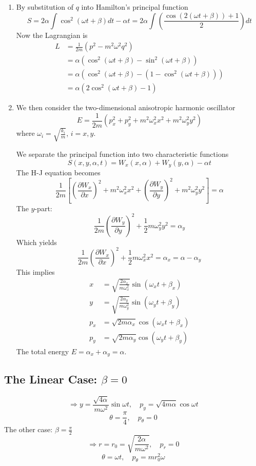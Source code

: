 \documentclass{article}
\begin{document}
\begin{enumerate}
		\item By substitution of $q$ into Hamilton's principal function
		\[ S = 2\alpha \int \cos^2(\omega t + \beta) dt - \alpha t = 2\alpha \int \left(\frac{\cos(2(\omega t + \beta)) + 1}{2}\right) dt \]
		Now the Lagrangian is
		\begin{align*}
			L &= \frac{1}{2m}(p^2 - m^2 \omega^2 q^2) \\
			&= \alpha(\cos^2(\omega t + \beta) - \sin^2(\omega t + \beta)) \\
			&= \alpha\left(\cos^2(\omega t + \beta) - (1 - \cos^2(\omega t + \beta))\right) \\
			&= \alpha(2\cos^2(\omega t + \beta) - 1)
		\end{align*}
		
		\item We then consider the two-dimensional anisotropic harmonic oscillator
		\[ E = \frac{1}{2m}(p_x^2 + p_y^2 + m^2 \omega_x^2 x^2 + m^2 \omega_y^2 y^2) \]
		where $\omega_i = \sqrt{\frac{k_i}{m}}$, $i=x,y$.
		
		We separate the principal function into two characteristic functions
		\[ S(x, y, \alpha, t) = W_x(x, \alpha) + W_y(y, \alpha) - \alpha t \]
		The H-J equation becomes
		\[ \frac{1}{2m}\left[ \left(\frac{\partial W_x}{\partial x}\right)^2 + m^2 \omega_x^2 x^2 + \left(\frac{\partial W_y}{\partial y}\right)^2 + m^2 \omega_y^2 y^2 \right] = \alpha \]
		The $y$-part:
		\[ \frac{1}{2m}\left(\frac{\partial W_y}{\partial y}\right)^2 + \frac{1}{2}m\omega_y^2 y^2 = \alpha_y \]
		Which yields
		\[ \frac{1}{2m}\left(\frac{\partial W_x}{\partial x}\right)^2 + \frac{1}{2}m\omega_x^2 x^2 = \alpha_x = \alpha - \alpha_y \]
		This implies
		\begin{align*}
			x &= \sqrt{\frac{2\alpha_x}{m\omega_x^2}} \sin(\omega_x t + \beta_x) \\
			y &= \sqrt{\frac{2\alpha_y}{m\omega_y^2}} \sin(\omega_y t + \beta_y) \\
			p_x &= \sqrt{2m\alpha_x} \cos(\omega_x t + \beta_x) \\
			p_y &= \sqrt{2m\alpha_y} \cos(\omega_y t + \beta_y)
		\end{align*}
		The total energy $E = \alpha_x + \alpha_y = \alpha$.
	\end{enumerate}
	\subsection{The Linear Case: $\beta=0$}
	\[
	\Rightarrow y = \frac{\sqrt{4\alpha}}{m\omega^2}\sin{\omega t}, \quad p_y = \sqrt{4m\alpha}\cos{\omega t}
	\]
	\[
	\theta = \frac{\pi}{4}, \quad p_\theta = 0
	\]
	The other case: $\beta = \frac{\pi}{2}$
	\[
	\Rightarrow r = r_0 = \sqrt{\frac{2\alpha}{m\omega^2}}, \quad p_r = 0
	\]
	\[
	\theta = \omega t, \quad p_\theta = m r_0^2 \omega
	\]
	
\end{document}

